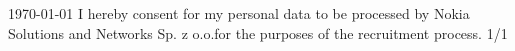 \documentclass[11pt, a4paper]{awesome-cv}
\begin{document}
\makecvheader

\makecvfooter
  {\today}
  {I hereby consent for my personal data to be processed by Nokia Solutions and Networks Sp. z o.o.{\break}for the purposes of the recruitment process.}
  {1/1}



\end{document}
